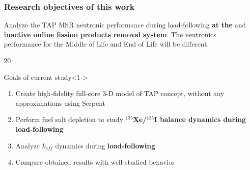 \begin{frame}
  \frametitle{Research objectives of this work}
     Analyze the TAP MSR neutronic performance during load-following 
     \textbf{at the } and \textbf{inactive online fission 
     products removal system}. The neutronics performance for the Middle of 
     Life and End of Life will be different.
  \begin{overlayarea}{\linewidth}{20\baselineskip}
     \begin{block}{Goals of current study}<1->
         \begin{enumerate}
         		\itemsep1em
                \item<1-> Create high-fidelity full-core 3-D model of 
                TAP concept, without any approximations using Serpent 
                \cite{leppanen_serpent_2014}
                \item<2-> Perform fuel salt depletion to study 
                \textbf{$^{135}$Xe/$^{135}$I balance dynamics during 
                load-following}
            	\item<3-> Analyze $k_{eff}$ dynamics during 
            	\textbf{load-following}
                \item<4-> Compare obtained results with well-studied 
                 behavior
         \end{enumerate}
      \end{block}
  \end{overlayarea}
\end{frame}
